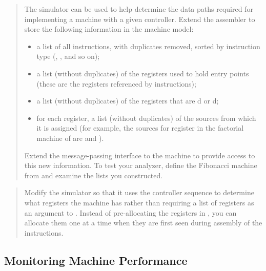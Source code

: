 \begin{quote}
 The simulator can be used to help
determine the data paths required for implementing a machine with a given
controller.  Extend the assembler to store the following information in the
machine model:

\begin{itemize}

\item
a list of all instructions, with duplicates removed, sorted by instruction type
(, , and so on);

\item
a list (without duplicates) of the registers used to hold entry points (these
are the registers referenced by  instructions);

\item
a list (without duplicates) of the registers that are d
or d;

\item
for each register, a list (without duplicates) of the sources from which it is
assigned (for example, the sources for register  in the factorial
machine of  are  and ).

\end{itemize}

Extend the message-passing interface to the machine to provide access to this
new information.  To test your analyzer, define the Fibonacci machine from
 and examine the lists you constructed.
\end{quote}

\begin{quote}
 Modify the simulator so that it
uses the controller sequence to determine what registers the machine has rather
than requiring a list of registers as an argument to .
Instead of pre-allocating the registers in , you can
allocate them one at a time when they are first seen during assembly of the
instructions.
\end{quote}

\subsection{Monitoring Machine Performance}
\label{Section 5.2.4}

